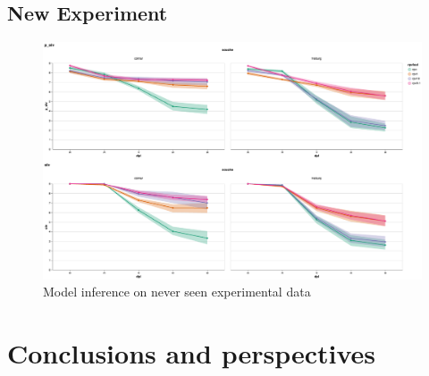 \documentclass[english]{article}
\begin{document}
\subsection{New Experiment}

\begin{figure}[H]
    \centering
    \includegraphics[width=0.9\linewidth]{p_viticola/resources/images/dm23.png}
    \caption{Model inference on never seen experimental data}
    \label{fig:2023DM89}
\end{figure}

\section{Conclusions and perspectives}
\end{document}
